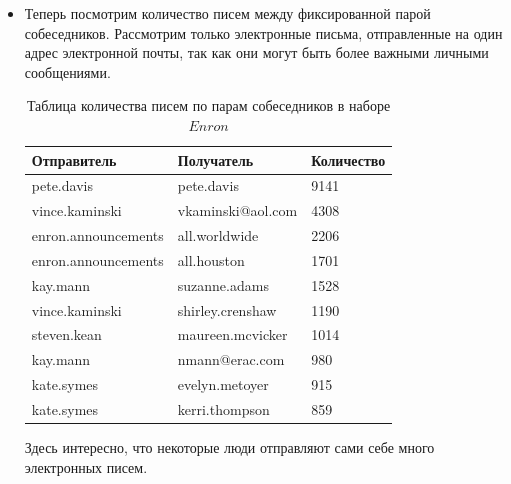 \begin{itemize}
\item Теперь посмотрим количество писем между фиксированной парой собеседников. Рассмотрим только электронные письма, отправленные на один адрес электронной почты, так как они могут быть более важными личными сообщениями.

\begin{table}[H]
\centering
\begin{tabular}{ | l | l | l | }
\hline
Отправитель & Получатель & Количество \\ \hline
pete.davis & pete.davis & 9141 \\ \hline
vince.kaminski & vkaminski@aol.com & 4308 \\ \hline
enron.announcements & all.worldwide & 2206 \\ \hline
enron.announcements & all.houston & 1701 \\ \hline
kay.mann & suzanne.adams & 1528 \\ \hline
vince.kaminski & shirley.crenshaw & 1190 \\ \hline
steven.kean & maureen.mcvicker & 1014 \\ \hline
kay.mann & nmann@erac.com	 & 980 \\ \hline
kate.symes & evelyn.metoyer & 	915 \\ \hline
kate.symes & kerri.thompson	 & 859 \\ \hline
\end{tabular}
\caption{Таблица количества писем по парам собеседников в наборе $Enron$}
\end{table}

Здесь интересно, что некоторые люди отправляют сами себе много электронных писем.


\end{itemize}

